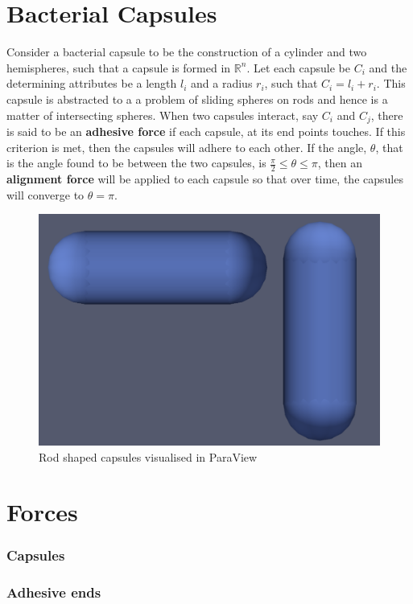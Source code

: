 \documentclass[journal, a4paper]{IEEEtran}
\begin{document}
\section{Bacterial Capsules}
	Consider a bacterial capsule to be the construction of a cylinder and two hemispheres, such that a capsule is formed in $\mathbb{R}^n$. Let each capsule be $C_i$ and the determining attributes be a length $l_i$ and a radius $r_i$, such that $C_i = l_i+r_i$. This capsule is abstracted to a a problem of sliding spheres on rods and hence is a matter of intersecting spheres. When two capsules interact, say $C_i$ and $C_j$, there is said to be an \textbf{adhesive force} if each capsule, at its end points touches. If this criterion is met, then the capsules will adhere to each other. If the angle, $\theta$, that is the angle found to be between the two capsules, is $\frac{\pi}{2} \leq \theta \leq \pi $, then an \textbf{alignment force} will be applied to each capsule so that over time, the capsules will converge to $\theta = \pi$.
	\begin{figure}
	    \centering
	    \includegraphics[scale = 0.22]{TwoCapsules.png}
	    \caption{Rod shaped capsules visualised in ParaView}
	    \label{fig:two capsules}
	\end{figure}
\section{Forces}

\subsubsection{Capsules}
\subsubsection{Adhesive ends}
\end{document}
